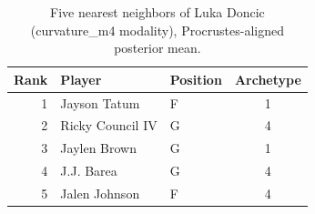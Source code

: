 \begin{table}[htbp]
  \centering\small
  \begin{tabular}{rllc}
    \toprule
    Rank & Player & Position & Archetype \\
    \midrule
    1 & Jayson Tatum & F & 1 \\
    2 & Ricky Council IV & G & 4 \\
    3 & Jaylen Brown & G & 1 \\
    4 & J.J. Barea & G & 4 \\
    5 & Jalen Johnson & F & 4 \\
    \bottomrule
  \end{tabular}
  \caption{Five nearest neighbors of Luka Doncic (curvature_m4 modality), Procrustes-aligned posterior mean.}
  \label{tab:Luka_Doncic_neighbors_curvature_m4}
\end{table}


